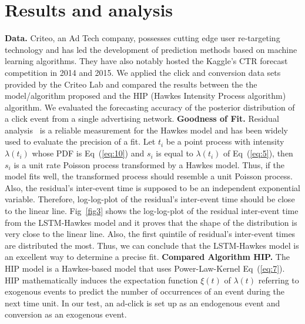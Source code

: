 \documentclass[10pt,letterpaper]{article}
\begin{document}
\section*{Results and analysis}
\textbf{Data.	}Criteo, an Ad Tech company, possesses cutting edge user re-targeting technology and has led the development of prediction methods based on machine learning algorithms. They have also notably hosted the Kaggle's CTR forecast competition in 2014 and 2015. We applied the click and conversion data sets provided by the Criteo Lab and compared the results between the the model/algorithm proposed and the HIP (Hawkes Intensity Process algorithm)~\cite{bib21} algorithm. We evaluated the forecasting accuracy of the posterior distribution of a click event from a single advertising network. \newline \newline
%
\textbf{Goodness of Fit.	}Residual analysis~\cite{bib19} is a reliable measurement for the Hawkes model and has been widely used to evaluate the precision of a fit. 
Let $t_i$ be a point process with intensity $\lambda(t_i)$ whose PDF is Eq~(\ref{eq:10}) and $s_i$ is equal to $\lambda(t_i)$ of Eq~(\ref{eq:5}), then $s_i$ is a unit rate Poisson process transformed by a Hawkes model. Thus, if the model fits well, the transformed process should resemble a unit Poisson process. Also, the residual’s inter-event time is supposed to be an independent exponential variable. Therefore, log-log-plot of the residual’s inter-event time should be close to the linear line. Fig~\ref{fig3} shows the log-log-plot of the residual inter-event time from the LSTM-Hawkes model and it proves that the shape of the distribution is very close to the linear line. Also, the first quintile of residual’s inter-event times are distributed the most. Thus, we can conclude that the LSTM-Hawkes model is an excellent way to determine a precise fit. \newline \newline
\textbf{Compared Algorithm HIP.	}The HIP model is a Hawkes-based model that uses Power-Law-Kernel Eq~(\ref{eq:7}). HIP mathematically induces the expectation function $\xi(t)$ of $\lambda(t)$ referring to exogenous events to predict the number of occurrences of an event during the next time unit. In our test, an ad-click is set up as an endogenous event and conversion as an exogenous event. 
\end{document}
